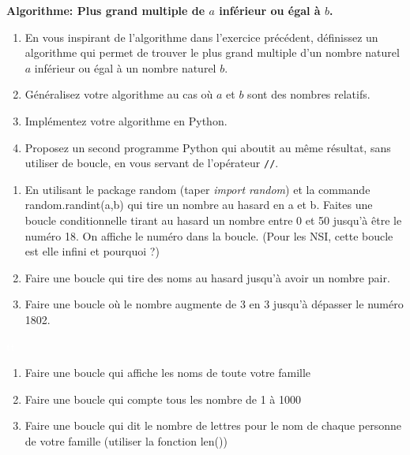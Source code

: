 \begin{exercise}
	\textbf{Algorithme: Plus grand multiple de $a$ inférieur ou égal à $b$.}
	\begin{enumerate}
		\item En vous inspirant de l'algorithme dans l'exercice précédent, définissez un algorithme qui permet de trouver le plus grand multiple d'un nombre naturel $a$ inférieur ou égal à un nombre naturel $b$.
		\item Généralisez votre algorithme au cas où $a$ et $b$ sont des nombres relatifs.
		\item Implémentez votre algorithme en Python.
		\item Proposez un second programme Python qui aboutit au même résultat, sans utiliser de boucle, en vous servant de l'opérateur \texttt{//}.
	\end{enumerate}	
\end{exercise}

\begin{exercise}
	\begin{enumerate}\textcolor{white}{text}
		\item En utilisant le package random (taper \textit{import random}) et la commande random.randint(a,b) qui tire un nombre au hasard en a et b. Faites une boucle conditionnelle tirant au hasard un nombre entre 0 et 50 jusqu'à être le numéro 18. On affiche le numéro dans la boucle. (Pour les NSI, cette boucle est elle infini et pourquoi ?)
		\item Faire une boucle qui tire des noms au hasard jusqu'à avoir un nombre pair.
		\item Faire une boucle où le nombre augmente de 3 en 3 jusqu'à dépasser le numéro 1802.
	\end{enumerate}
\end{exercise}

\begin{exercise}
	\textcolor{white}{tt}
	\begin{enumerate}
		\item Faire une boucle qui affiche les noms de toute votre famille
		\item Faire une boucle qui compte tous les nombre de 1 à 1000
		\item Faire une boucle qui dit le nombre de lettres pour le nom de chaque personne de votre famille (utiliser la fonction len())
	\end{enumerate}
\end{exercise}